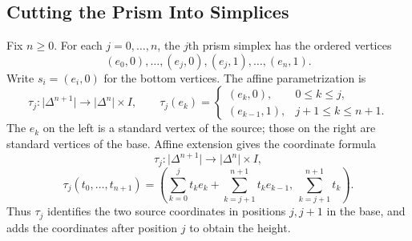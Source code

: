 \documentclass[11pt]{article}
\begin{document}
\subsection{Cutting the Prism Into Simplices}\label{sec:details}
Fix $n\ge0$. For each $j=0,\ldots,n$, the $j$th prism simplex has the ordered vertices
\[
(e_0,0),\ldots,(e_j,0),(e_j,1),\ldots,(e_n,1).
\]
Write $s_i=(e_i,0)$ for the bottom vertices. The affine parametrization is
\[
\tau_j:\lvert\Delta^{n+1}\rvert\longrightarrow\lvert\Delta^n\rvert\times I,
\qquad
\tau_j(e_k)=
\begin{cases}
(e_k,0),&0\le k\le j,\\
(e_{k-1},1),&j+1\le k\le n+1.
\end{cases}
\]
The $e_k$ on the left is a standard vertex of the source; those on the right are standard vertices of the base. Affine extension gives the coordinate formula
\[
\tau_j:\lvert\Delta^{n+1}\rvert\longrightarrow\lvert\Delta^n\rvert\times I,
\]
\[
\tau_j(t_0,\ldots,t_{n+1})
=\left(\sum_{k=0}^jt_ke_k+\sum_{k=j+1}^{n+1}t_ke_{k-1},\ \sum_{k=j+1}^{n+1}t_k\right).
\]
Thus $\tau_j$ identifies the two source coordinates in positions $j,j+1$ in the base, and adds the coordinates after position $j$ to obtain the height.
\end{document}
